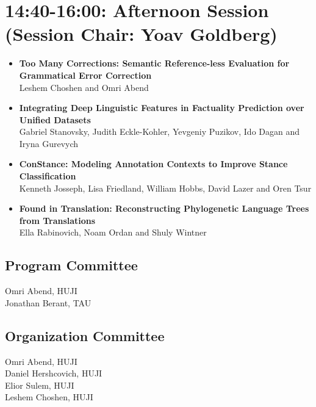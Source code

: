 \documentclass[a0,portrait]{a0poster}
\begin{document}
    \begin{minipage}{.83\textwidth}
        \section*{14:40-16:00: Afternoon Session (Session Chair: Yoav Goldberg)}

        \begin{itemize}
            \item\LARGE
            \textbf{Too Many Corrections: Semantic Reference-less Evaluation for
            Grammatical Error Correction}\\
            \Large Leshem Choshen and Omri Abend
            \item\LARGE
            \textbf{Integrating Deep Linguistic Features in Factuality Prediction
            over Unified Datasets}\\
            \Large Gabriel Stanovsky, Judith Eckle-Kohler, Yevgeniy Puzikov, Ido Dagan
            and Iryna Gurevych
            \item\LARGE
            \textbf{ConStance: Modeling Annotation Contexts to Improve Stance
            Classification}\\
            \Large Kenneth Josseph, Lisa Friedland, William Hobbs, David Lazer and Oren
            Tsur
            \item\LARGE
            \textbf{Found in Translation: Reconstructing Phylogenetic Language
            Trees from Translations}\\
            \Large Ella Rabinovich, Noam Ordan and Shuly Wintner
        \end{itemize}

    \end{minipage}
    \begin{adjustbox}{margin=1em,minipage=.15\textwidth,frame}
        \large
        \subsection*{Program Committee}
        Omri Abend, HUJI\\
        Jonathan Berant, TAU\\

        \subsection*{Organization Committee}
        Omri Abend, HUJI\\
        Daniel Hershcovich, HUJI\\
        Elior Sulem, HUJI\\
        Leshem Choshen, HUJI
    \end{adjustbox}
\end{document}
